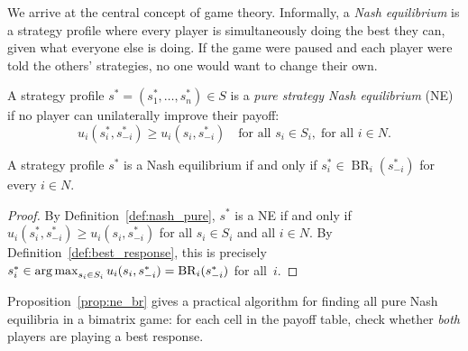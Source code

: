 \documentclass[11pt,a4paper]{article}
\DeclareMathOperator{\BR}{BR}
\begin{document}
We arrive at the central concept of game theory.  Informally, a
\emph{Nash equilibrium} is a strategy profile where every player is
simultaneously doing the best they can, given what everyone else is doing.
If the game were paused and each player were told the others' strategies,
no one would want to change their own.

\begin{definition}
\label{def:nash_pure}
A strategy profile $s^* = (s_1^*, \ldots, s_n^*) \in S$ is a \emph{pure
strategy Nash equilibrium} (NE) if no player can unilaterally improve
their payoff:
\[
    u_i(s_i^*, s_{-i}^*) \geq u_i(s_i, s_{-i}^*)
    \quad \text{for all } s_i \in S_i, \; \text{for all } i \in N.
\]
\end{definition}

\begin{proposition}
\label{prop:ne_br}
A strategy profile $s^*$ is a Nash equilibrium if and only if
$s_i^* \in \BR_i(s_{-i}^*)$ for every $i \in N$.
\end{proposition}

\begin{proof}
By Definition~\ref{def:nash_pure}, $s^*$ is a NE if and only if
$u_i(s_i^*, s_{-i}^*) \geq u_i(s_i, s_{-i}^*)$ for all $s_i \in S_i$ and
all $i \in N$.  By Definition~\ref{def:best_response}, this is precisely
$s_i^* \in \argmax_{s_i \in S_i} u_i(s_i, s_{-i}^*) = \BR_i(s_{-i}^*)$
for all~$i$.
\end{proof}

Proposition~\ref{prop:ne_br} gives a practical algorithm for finding all
pure Nash equilibria in a bimatrix game: for each cell in the payoff table,
check whether \emph{both} players are playing a best response.
\end{document}
